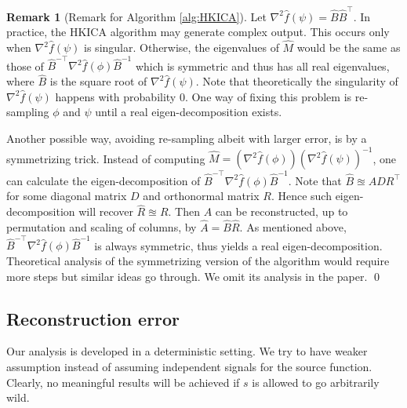 \documentclass[twoside]{article}
\theoremstyle{definition}
\newtheorem{remark}[lemma]{Remark}
\begin{document}
\begin{remark}[Remark for Algorithm \ref{alg:HKICA}]
\label{rmk:symmetrization}
Let $\nabla^2\widehat{f}(\psi) =\widehat{B}\widehat{B}^{\top} $.
In practice, the HKICA algorithm may generate complex output. 
This occurs only when $\nabla^2\widehat{f}(\psi)$ is singular. 
Otherwise, the eigenvalues of $\widehat{M}$ would be the same as those of
$\widehat{B}^{-\top}\nabla^2 \widehat{f}(\phi)\widehat{B}^{-1}$ which is symmetric and thus has all real eigenvalues, where $\widehat{B} $ is the square root of $\nabla^2\widehat{f}(\psi)$. 
Note that theoretically the singularity of $\nabla^2\widehat{f}(\psi)$ happens with probability 0. 
One way of fixing this problem is re-sampling $\phi$ and $\psi$ until a real eigen-decomposition exists.

Another possible way, avoiding re-sampling albeit with larger error, is by a symmetrizing trick.
Instead of computing $\widehat{M} = (\nabla^2 \widehat{f}(\phi))(\nabla^2\widehat{f}(\psi))^{-1}$, one can calculate the eigen-decomposition of  $\widehat{B}^{-\top}\nabla^2 \widehat{f}(\phi)\widehat{B}^{-1}$. 
Note that $\widehat{B} \approxeq ADR^{\top}$ for some diagonal matrix $D$ and orthonormal matrix $R$. 
Hence such eigen-decomposition will recover $\widehat{R}\approxeq R$. 
Then $A$ can be reconstructed, up to permutation and scaling of columns, by $\widehat{A} = \widehat{B}\widehat{R}$.
As mentioned above, $ \widehat{B}^{-\top}\nabla^2 \widehat{f}(\phi)\widehat{B}^{-1}$ is always symmetric, thus yields a real eigen-decomposition. 
Theoretical analysis of the symmetrizing version of the algorithm would require more steps but similar ideas go through. We omit its analysis in the paper.
\qed
\end{remark}

\subsection{Reconstruction error}
\label{subsec:errorHK}
Our analysis is developed in a deterministic setting.
We try to have weaker assumption instead of assuming independent signals for the source function. 
Clearly, no meaningful results will be achieved if $s$ is allowed to go arbitrarily wild. 
 
\end{document}
